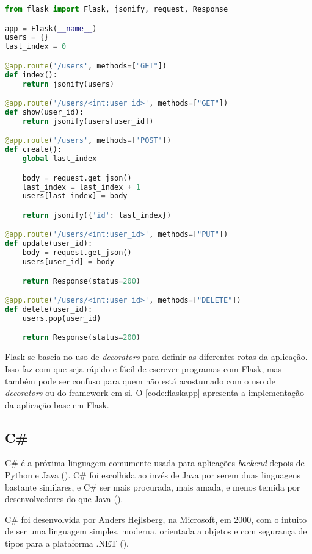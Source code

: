 \begin{lstlisting}[language=Python,label={code:flaskapp},caption={Aplicação base em Python com Flask}]
from flask import Flask, jsonify, request, Response

app = Flask(__name__)
users = {}
last_index = 0

@app.route('/users', methods=["GET"])
def index():
    return jsonify(users)

@app.route('/users/<int:user_id>', methods=["GET"])
def show(user_id):
    return jsonify(users[user_id])

@app.route('/users', methods=['POST'])
def create():
    global last_index

    body = request.get_json()
    last_index = last_index + 1
    users[last_index] = body

    return jsonify({'id': last_index})

@app.route('/users/<int:user_id>', methods=["PUT"])
def update(user_id):
    body = request.get_json()
    users[user_id] = body

    return Response(status=200)

@app.route('/users/<int:user_id>', methods=["DELETE"])
def delete(user_id):
    users.pop(user_id)

    return Response(status=200)

\end{lstlisting}

Flask se baseia no uso de \textit{decorators} para definir as diferentes rotas
da aplicação. Isso faz com que seja rápido e fácil de escrever programas com Flask,
mas também pode ser confuso para quem não está acostumado com o uso de \textit{decorators}
ou do framework em si. O \autoref{code:flaskapp} apresenta a implementação da aplicação
base em Flask.

\subsection{C\#}

C\# é a próxima linguagem comumente usada para aplicações \textit{backend} depois
de Python e Java (\textcite{tiobeindex}). C\# foi escolhida ao invés de Java por
serem duas linguagens bastante similares, e C\# ser mais procurada, mais amada,
e menos temida por desenvolvedores do que Java (\textcite{stackoverflowsurvey}).

C\# foi desenvolvida por Anders Hejlsberg, na Microsoft, em 2000, com o intuito
de ser uma linguagem simples, moderna, orientada a objetos e com segurança de tipos
para a plataforma .NET (\textcite{csharpmanual}).

